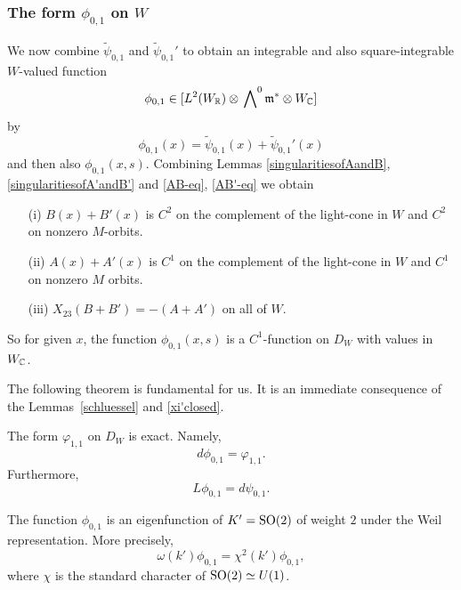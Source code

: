 


\subsubsection{The form $\phi_{0,1}$ on $W$}




We now combine $\tilde{\psi}_{0,1}$ and $\tilde{\psi}_{0,1}'$ to obtain an integrable and also square-integrable $W$-valued function 
\[
\phi_{0,1}  \in [L^2(W_{\mathbb{R}}) \otimes \sideset{}{^{0}}\bigwedge \mathfrak{m}^{\ast} \otimes W_{\mathbb{C}}]
\]
by
\begin{equation*}
\phi_{0,1}(x) = \tilde{\psi}_{0,1}(x) + \tilde{\psi}_{0,1}'(x)
\end{equation*}
and then also $\phi_{0,1}(x,s)$. Combining Lemmas \ref{singularitiesofAandB}, \ref{singularitiesofA'andB'} and \eqref{AB-eq}, \eqref{AB'-eq} we obtain

\begin{proposition}\label{phi-prop}
\begin{itemize}
\item[(i)] $B(x) + B'(x)$ is $C^2$ on the complement of the light-cone in $W$ and  $C^2$ on nonzero $M$-orbits.
\item[(ii)] $A(x) + A'(x)$ is $C^1$ on the complement of the light-cone in $W$ and  $C^1$ on nonzero $M$ orbits.
\item[(iii)] $X_{23}(B + B') = -(A + A')$ on all of $W$.
\end{itemize}
So for given $x$, the function $\phi_{0,1}(x,s)$ is a $C^1$-function on $D_W$ with values in $W_{\mathbb{C}}$.
\end{proposition}


The following theorem is fundamental for us. It is an immediate consequence of the Lemmas~\ref{schluessel} and \ref{xi'closed}. 

\begin{theorem}\label{local-phi}
The form $\varphi_{1,1}$ on $D_W$ is exact. Namely,
\[
d \phi_{0,1} = \varphi_{1,1}.
\]
Furthermore,
\[
L \phi_{0,1} = d \psi_{0,1}.
\]
\end{theorem}

\begin{proposition}
The function $\phi_{0,1}$ is an eigenfunction of $K'=\operatorname{SO}(2)$ of weight $2$ under the Weil representation. More precisely,
\[
\omega(k') \phi_{0,1} =  \chi^2(k')\phi_{0,1},
\]
where $\chi$ is the standard character of $\operatorname{SO}(2) \simeq U(1)$.
\end{proposition}

